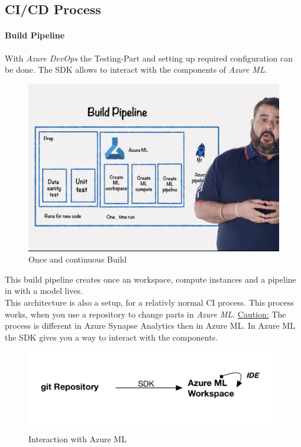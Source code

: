 \subsection{CI/CD Process}
\paragraph{Build Pipeline}

With \textit{Azure DevOps} the Testing-Part and setting up required configuration can be done. The \gls{SDK} allows to interact with the components of \textit{Azure ML}. 


\begin{figure}[H]
	\centering
	\includegraphics[scale = 0.1]{attachment/chapter_10/Scc020}
	\caption{Once and continuous Build}
\end{figure}

This build pipeline creates once an workspace, compute instances and a pipeline in with a model lives.\\

This architecture is also a setup, for a relativly normal \gls{CI} process. This process works, when you use a repository to change parts in \textit{Azure ML}. \underline{Caution:} The process is different in Azure Synapse Analytics then in Azure ML. In Azure ML the \gls{SDK} gives you a way to interact with the components.

\begin{figure}[H]
	\centering
	\includegraphics[scale = 0.3]{attachment/chapter_10/Scc021}
	\caption{Interaction with Azure ML}
\end{figure}


